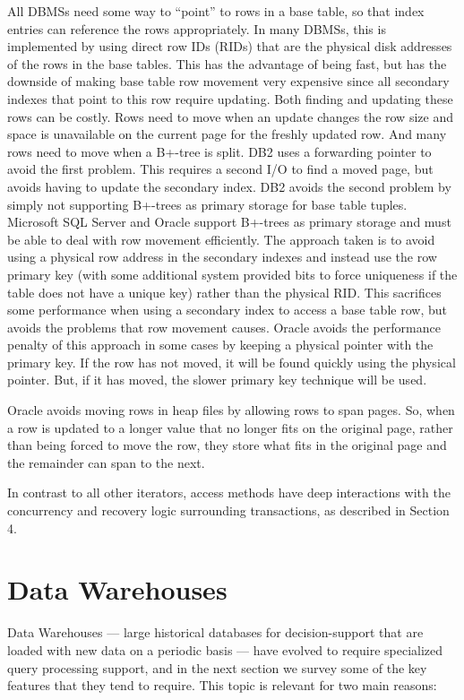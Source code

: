 \documentclass[a4paper,11pt,twoside,openright]{book}
\begin{document}
All DBMSs need some way to ``point'' to rows in a base table, so that
index entries can reference the rows appropriately. In many DBMSs, this
is implemented by using direct row IDs (RIDs) that are the physical disk
addresses of the rows in the base tables. This has the advantage of
being fast, but has the downside of making base table row movement very
expensive since all secondary indexes that point to this row require
updating. Both finding and updating these rows can be costly. Rows need
to move when an update changes the row size and space is unavailable on
the current page for the freshly updated row. And many rows need to move
when a B+-tree is split. DB2 uses a forwarding pointer to avoid the
first problem. This requires a second I/O to find a moved page, but
avoids having to update the secondary index. DB2 avoids the second
problem by simply not supporting B+-trees as primary storage for base
table tuples. Microsoft SQL Server and Oracle support B+-trees as
primary storage and must be able to deal with row movement efficiently.
The approach taken is to avoid using a physical row address in the
secondary indexes and instead use the row primary key (with some
additional system provided bits to force uniqueness if the table does
not have a unique key) rather than the physical RID. This sacrifices
some performance when using a secondary index to access a base table
row, but avoids the problems that row movement causes. Oracle avoids the
performance penalty of this approach in some cases by keeping a physical
pointer with the primary key. If the row has not moved, it will be found
quickly using the physical pointer. But, if it has moved, the slower
primary key technique will be used.

Oracle avoids moving rows in heap files by allowing rows to span pages.
So, when a row is updated to a longer value that no longer fits on the
original page, rather than being forced to move the row, they store what
fits in the original page and the remainder can span to the next.

In contrast to all other iterators, access methods have deep
interactions with the concurrency and recovery logic surrounding
transactions, as described in Section 4.

\hypertarget{data-warehouses}{%
\section{Data Warehouses}\label{data-warehouses}}

Data Warehouses --- large historical databases for decision-support that
are loaded with new data on a periodic basis --- have evolved to require
specialized query processing support, and in the next section we survey
some of the key features that they tend to require. This topic is
relevant for two main reasons:
\end{document}
